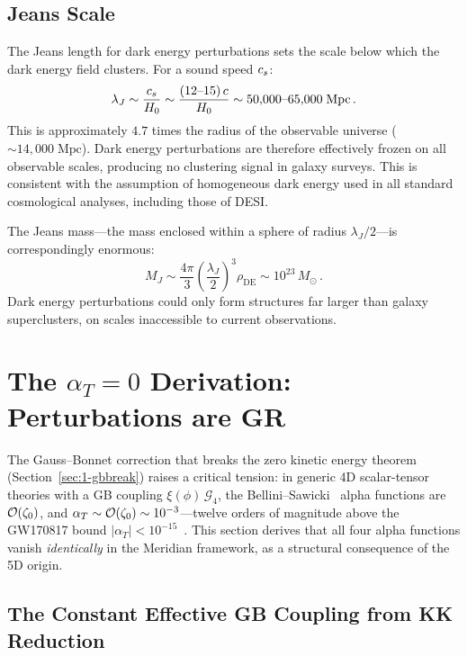\subsection{Jeans Scale}
\label{sec:1-jeans}

The Jeans length for dark energy perturbations sets the scale below which the dark energy field clusters. For a sound speed $c_s$:
\begin{equation}
\label{eq:1-jeans-length}
\lambda_J \sim \frac{c_s}{H_0} \sim \frac{(12\text{--}15)\,c}{H_0} \sim 50{,}000\text{--}65{,}000\;\mathrm{Mpc}\,.
\end{equation}
This is approximately $4.7$ times the radius of the observable universe ($\sim 14{,}000\;\mathrm{Mpc}$). Dark energy perturbations are therefore effectively frozen on all observable scales, producing no clustering signal in galaxy surveys. This is consistent with the assumption of homogeneous dark energy used in all standard cosmological analyses, including those of DESI.

The Jeans mass---the mass enclosed within a sphere of radius $\lambda_J/2$---is correspondingly enormous:
\begin{equation}
\label{eq:1-jeans-mass}
M_J \sim \frac{4\pi}{3}\left(\frac{\lambda_J}{2}\right)^{\!3}\!\rho_{\mathrm{DE}} \sim 10^{23}\, M_\odot\,.
\end{equation}
Dark energy perturbations could only form structures far larger than galaxy superclusters, on scales inaccessible to current observations.


\section{The \texorpdfstring{$\alpha_T = 0$}{alphaT = 0} Derivation: Perturbations are GR}
\label{sec:1-alphaT}

The Gauss--Bonnet correction that breaks the zero kinetic energy theorem (Section~\ref{sec:1-gbbreak}) raises a critical tension: in generic 4D scalar-tensor theories with a GB coupling $\xi(\phi)\,\mathcal{G}_4$, the Bellini--Sawicki~\cite{ch1:bellini-sawicki} alpha functions are $\mathcal{O}\!\left(\zeta_0\right)$, and $\alpha_T \sim \mathcal{O}\!\left(\zeta_0\right) \sim 10^{-3}$---twelve orders of magnitude above the GW170817 bound $|\alpha_T| < 10^{-15}$~\cite{ch1:gw170817}. This section derives that all four alpha functions vanish \emph{identically} in the Meridian framework, as a structural consequence of the 5D origin.

\subsection{The Constant Effective GB Coupling from KK Reduction}
\label{sec:1-alphaT-kk}

